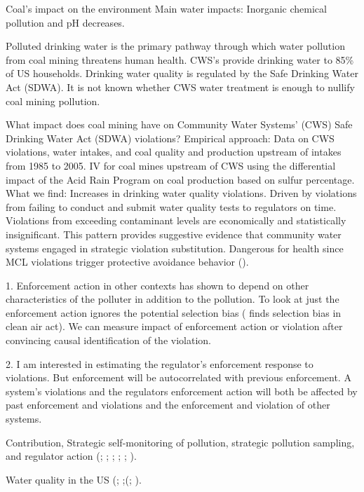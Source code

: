 \documentclass{article}
\begin{document}
Coal's impact on the environment  Main water impacts: Inorganic chemical pollution and  pH decreases.

Polluted drinking water is the primary pathway through which water pollution from coal mining threatens human health. CWS's provide drinking water to 85\% of US households. Drinking water quality is regulated by the Safe Drinking Water Act (SDWA).  It is not known whether CWS water treatment is enough to nullify coal mining pollution.

What impact does coal mining have on Community Water Systems' (CWS) Safe Drinking Water Act (SDWA) violations? Empirical approach: Data on CWS violations, water intakes, and coal quality and production upstream of intakes from 1985 to 2005. IV for coal mines upstream of CWS using the differential impact of the Acid Rain Program on coal production based on sulfur percentage. What we find: Increases in drinking water quality violations. Driven by violations from failing to conduct and submit water quality tests to regulators on time. Violations from exceeding contaminant levels are economically and statistically insignificant. This pattern provides suggestive evidence that community water systems engaged in strategic violation substitution. Dangerous for health since MCL violations trigger protective avoidance behavior (\cite{zivin2011water}).

1. Enforcement action in other contexts has shown to depend on other characteristics of the polluter in addition to the pollution. To look at just the enforcement action ignores the potential selection bias (\cite{hanna2010impact} finds selection bias in clean air act). We can measure impact of enforcement action or violation after convincing causal identification of the violation.

2. I am interested in estimating the regulator's enforcement response to violations. But enforcement will be autocorrelated with previous enforcement. A system's violations and the regulators enforcement action will both be affected by past enforcement and violations and the enforcement and violation of other systems. 

Contribution, 
Strategic self-monitoring of pollution, strategic pollution sampling, and regulator action (\cite{helland1998enforcement}; \cite{stafford2002effect}; \cite{bennear2009sampling}; \cite{duflo2013truth}; \cite{duflo2018value}; \cite{mu2024s}). 
    
Water quality in the US (\cite{bennear2008impacts}; \cite{zivin2011water};\cite{allaire2018national}(\cite{keiser2019us}; \cite{keiser2023us}).
    
\end{document}
